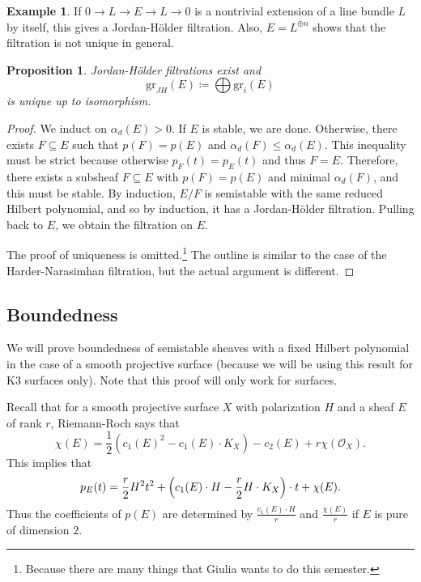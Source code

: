 \documentclass[leqno, openany]{memoir}
\newtheorem{prop}[thm]{Proposition}
\theoremstyle{definition}
\newtheorem{exm}[thm]{Example}
\theoremstyle{remark}
\theoremstyle{plain}
\theoremstyle{definition}
\theoremstyle{remark}
\newcommand{\mc}[1]{\mathcal{#1}}
\newcommand{\mr}[1]{\mathrm{#1}}
\begin{document}
\begin{exm}
    If $0 \to L \to E \to L \to 0$ is a nontrivial extension of a line bundle $L$ by itself, this gives a Jordan-H\"older filtration. Also, $E = L^{\oplus n}$ shows that the filtration is not unique in general.
\end{exm}

\begin{prop}
    Jordan-H\"older filtrations exist and
    \[ \mr{gr}_{JH}(E) \coloneqq \bigoplus \mr{gr}_i(E) \]
    is unique up to isomorphism.
\end{prop}

\begin{proof}
    We induct on $\alpha_d(E) > 0$. If $E$ is stable, we are done. Otherwise, there exists $F \subseteq E$ such that $p(F) = p(E)$ and $\alpha_d(F) \leq \alpha_d(E)$. This inequality must be strict because otherwise $p_F(t) = p_E(t)$ and thus $F = E$. Therefore, there exists a subsheaf $F \subseteq E$ with $p(F) = p(E)$ and minimal $\alpha_d(F)$, and this must be stable. By induction, $E/F$ is semistable with the same reduced Hilbert polynomial, and so by induction, it has a Jordan-H\"older filtration. Pulling back to $E$, we obtain the filtration on $E$. 

    The proof of uniqueness is omitted.\footnote{Because there are many things that Giulia wants to do this semester.} The outline is similar to the case of the Harder-Narasimhan filtration, but the actual argument is different.
\end{proof}

\subsection{Boundedness}%
\label{sub:boundedness}

We will prove boundedness of semistable sheaves with a fixed Hilbert polynomial in the case of a smooth projective surface (because we will be using this result for K3 surfaces only). Note that this proof will only work for surfaces.

Recall that for a smooth projective surface $X$ with polarization $H$ and a sheaf $E$ of rank $r$, Riemann-Roch says that
\[ \chi(E) = \frac{1}{2} (c_1(E)^2 - c_1(E) \cdot K_X) - c_2(E) + r \chi(\mc{O}_X). \]
This implies that
\[ p_E(t) = \frac{r}{2} H^2 t^2 + \qty(c_1(E) \cdot H - \frac{r}{2} H \cdot K_X) \cdot t + \chi(E). \]
Thus the coefficients of $p(E)$ are determined by $\frac{c_1(E) \cdot H}{r}$ and $\frac{\chi(E)}{r}$ if $E$ is pure of dimension $2$.
\end{document}
